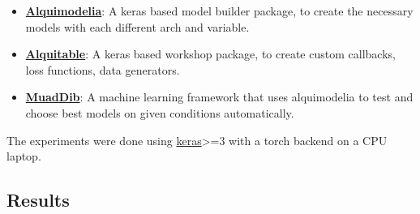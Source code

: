 \begin{itemize}
    \item \textbf{\href{https://github.com/alquimodelia/alquimodelia}{Alquimodelia}}: A keras based model builder package, to create the necessary models with each different arch and variable.
    \item \textbf{\href{https://github.com/alquimodelia/alquitable}{Alquitable}}: A keras based workshop package, to create custom callbacks, loss functions, data generators.
    \item \textbf{\href{https://github.com/alquimodelia/MuadDib}{MuadDib}}: A machine learning framework that uses alquimodelia to test and choose best models on given conditions automatically.
\end{itemize}

The experiments were done using \href{https://keras.io/}{keras}>=3 with a torch backend on a CPU laptop.

\subsection{Results}





